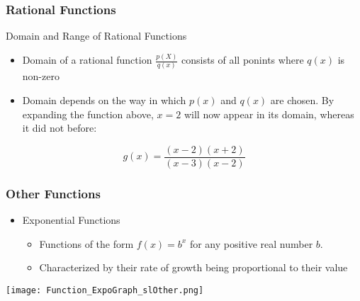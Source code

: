 \documentclass{beamer}
\begin{document}
\begin{frame}[fragile]\frametitle{Rational Functions}
\begin{center} Domain and Range of Rational Functions \end{center}

\begin{itemize}
  \item Domain of a rational function $\frac{p(X)}{q(x)}$ consists of all ponints where $q(x)$ is non-zero
  \item Domain depends on the way in which $p(x)$ and $q(x)$ are chosen. By expanding the function above, $x = 2$ will now appear in its domain, whereas it did not before:
\end{itemize}

\begin{equation*}
  g(x) = \frac{(x-2)(x + 2)}{(x - 3)(x - 2)}
\end{equation*}

\end{frame}

\begin{frame}[fragile]\frametitle{Other Functions}

\begin{itemize}
  \item Exponential Functions
  \begin{itemize}
    \item Functions of the form $f(x) =  b^x$ for any positive real number $b$.
    \item Characterized by their rate of growth being proportional to their value
  \end{itemize}
\end{itemize}
\begin{center}\texttt{[image: Function\_ExpoGraph\_slOther.png]} \end{center}

\end{frame}
\end{document}
